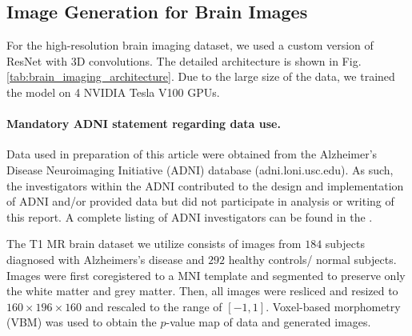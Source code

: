 \subsection{Image Generation for Brain Images}

For the high-resolution brain imaging dataset, we used a custom version of ResNet \citep{he2016resnet} with 3D convolutions. The detailed architecture is shown in Fig. \ref{tab:brain_imaging_architecture}. Due to the large size of the data, we trained the model on 4 NVIDIA Tesla V100 GPUs. 

\paragraph{Mandatory ADNI statement regarding data use.} Data used in preparation of this article were obtained from the Alzheimer’s Disease Neuroimaging Initiative
(ADNI) database (adni.loni.usc.edu). As such, the investigators within the ADNI contributed to the design
and implementation of ADNI and/or provided data but did not participate in analysis or writing of this report.
A complete listing of ADNI investigators can be found in the \href{http://adni.loni.usc.edu/wp-content/uploads/how_to_apply/ADNI_Acknowledgement_List.pdf}{}.

The T1 MR brain dataset we utilize consists of images from $184$ subjects diagnosed with Alzheimers's disease and $292$ healthy controls/ normal subjects. Images were first coregistered to a MNI template and segmented to preserve only the white matter and grey matter. Then, all images were resliced and resized to $160 \times 196 \times 160$ and rescaled to the range of $[-1, 1]$. Voxel-based morphometry (VBM) was used to obtain the $p$-value map of data and generated images.



  
